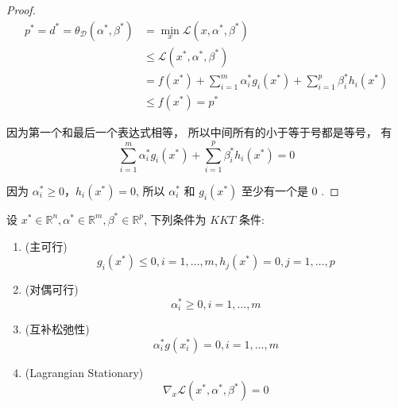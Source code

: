 \begin{proof}
    \begin{equation}
    \begin{aligned}
    p^{*}=d^{*}=\theta_{\mathcal{D}}\left(\alpha^{*}, \beta^{*}\right) &=\min _{x} \mathcal{L}\left(x, \alpha^{*}, \beta^{*}\right) \\
    & \leqslant \mathcal{L}\left(x^{*}, \alpha^{*}, \beta^{*}\right) \\
    &=f\left(x^{*}\right)+\sum_{i=1}^{m} \alpha_{i}^{*} g_{i}\left(x^{*}\right)+\sum_{i=1}^{p} \beta_{i}^{*} h_{i}\left(x^{*}\right) \\
    & \leqslant f\left(x^{*}\right)=p^{*}
    \end{aligned}
    \end{equation}

    因为第一个和最后一个表达式相等， 所以中间所有的小于等于号都是等号， 有 \begin{equation} \sum_{i=1}^{m} \alpha_{i}^{*} g_{i}\left(x^{*}\right)+\sum_{i=1}^{p} \beta_{i}^{*} h_{i}\left(x^{*}\right)=0 \end{equation}

    因为 $ \alpha_{i}^{*} \geqslant 0 ， h_{i}\left(x^{*}\right)=0 $, 所以 $ \alpha_{i}^{*} $ 和 $ g_{i}\left(x^{*}\right) $ 至少有一个是 0 .
\end{proof}

\begin{theorem}
    设 $ x^{*} \in \mathbb{R}^{n}, \alpha^{*} \in \mathbb{R}^{m}, \beta^{*} \in \mathbb{R}^{p} $, 下列条件为 $ {KKT} $ 条件:

    \begin{enumerate}
        \item (主可行) \begin{equation} g_{i}\left(x^{*}\right) \leqslant 0, i=1, \ldots, m, h_{j}\left(x^{*}\right)=0, j=1, \ldots, p \end{equation}
        \item (对偶可行) \begin{equation} \alpha_{i}^{*} \geqslant 0, i=1, \ldots, m \end{equation}
        \item (互补松弛性) \begin{equation} \alpha_{i}^{*} g\left(x_{i}^{*}\right)=0, i=1, \ldots, m \end{equation}
        \item (Lagrangian Stationary) \begin{equation} \nabla_{x} \mathcal{L}\left(x^{*}, \alpha^{*}, \beta^{*}\right)=0 \end{equation}
    \end{enumerate}

\end{theorem}

